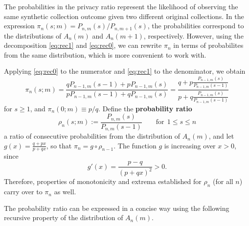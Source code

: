 \documentclass[11pt]{article}
\begin{document}
The probabilities in the privacy ratio represent the likelihood of observing
the same synthetic collection outcome given two different original collections.
In the expression $\pi_n(s;m) = P_{n,m}(s) / P_{n,m+1}(s)$, the probabilities
correspond to the distributions of $A_n(m)$ and $A_n(m+1)$, respectively.
However, using the decomposition \eqref{eq:rec1} and \eqref{eq:rec0}, we can
rewrite $\pi_n$ in terms of probabilites from the same distribution, which is
more convenient to work with.

Applying \eqref{eq:rec0} to the numerator and \eqref{eq:rec1} to the denominator,
we obtain
\[ \pi_n(s;m) =
\frac{qP_{n-1,m}(s-1) + pP_{n-1,m}(s)}{pP_{n-1,m}(s-1) + qP_{n-1,m}(s)} =
\frac{q + p \frac{P_{n-1,m}(s)}{P_{n-1,m}(s-1)}}
    {p + q \frac{P_{n-1,m}(s)}{P_{n-1,m}(s-1)}}
\]
for $s \geq 1$, and $\pi_n(0;m) \equiv p/q$.
Define the \textbf{probability ratio}
\[ \rho_n(s;m) := \frac{P_{n,m}(s)}{P_{n,m}(s-1)}
\qquad\text{for}\ \ 1 \leq s\leq n \]
a ratio of consecutive probabilities from the distribution of $A_n(m)$, and let
$g(x) = \frac{q + px}{p + qx}$, so that $\pi_n = g \circ \rho_{n-1}$.
The function $g$ is increasing over $x>0$, since
\[ g'(x) = \frac{p-q}{(p+qx)^2} > 0. \]
Therefore, properties of monotonicity and extrema established for $\rho_n$ (for
all $n$) carry over to $\pi_n$ as well.

The probability ratio can be expressed in a concise way using the following 
recursive property of the distribution of $A_n(m)$.
\end{document}
